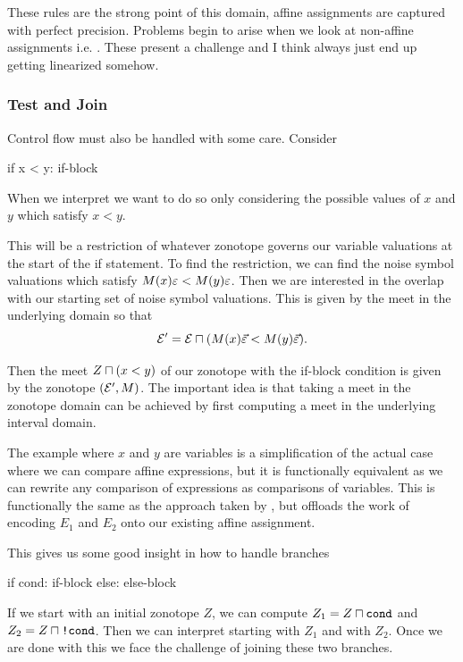 \begin{definition}
These rules are the strong point of this domain, affine assignments are captured with perfect precision.
Problems begin to arise when we look at non-affine assignments i.e. .
These present a challenge and I think always just end up getting linearized somehow.

\subsubsection{Test and Join}
Control flow must also be handled with some care. 
Consider
\begin{code}
if x < y:
  if-block
\end{code}
When we interpret  we want to do so only considering the possible values of $x$ and $y$ which satisfy $x < y$.

This will be a restriction of whatever zonotope governs our variable valuations at the start of the if statement.
To find the restriction, we can find the noise symbol valuations which satisfy $M(x) \varepsilon < M(y) \varepsilon$.
Then we are interested in the overlap with our starting set of noise symbol valuations.
This is given by the meet in the underlying domain so that 
\[
  \mathcal{E}' =\mathcal{E} \sqcap (M(x) \vec{\varepsilon} < M(y) \vec{\varepsilon}).
\]

Then the meet $Z \sqcap (x < y)$ of our zonotope with the if-block condition is given by the zonotope $(\mathcal{E}', M)$.
The important idea is that taking a meet in the zonotope domain can be achieved by first computing a meet in the underlying interval domain.

The example where $x$ and $y$ are variables is a simplification of the actual case where we can compare affine expressions, but it is functionally equivalent as we can rewrite any comparison of expressions as comparisons of variables.
This is functionally the same as the approach taken by \cite{TOPAZ}, but offloads the work of encoding $E_1$ and $E_2$ onto our existing affine assignment.

This gives us some good insight in how to handle branches
\begin{code}
if cond:
  if-block
else:
  else-block
\end{code}
If we start with an initial zonotope $Z$, we can compute $Z_1 = Z \sqcap \texttt{cond}$ and $Z_2 = Z \sqcap \texttt{!cond}$.
Then we can interpret  starting with $Z_1$ and  with $Z_2$.
Once we are done with this we face the challenge of joining these two branches.


\end{definition}
